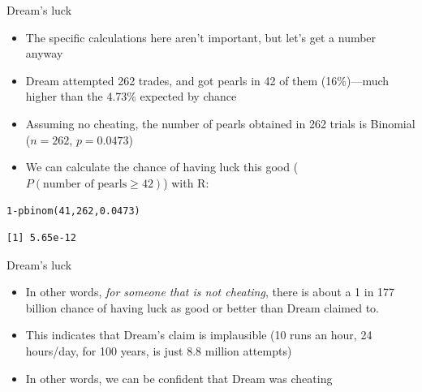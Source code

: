 \documentclass{beamer}\usepackage[]{graphicx}\usepackage[]{color}
\makeatletter
\newcommand{\hlnum}[1]{\textcolor[rgb]{0.824,0.412,0.118}{#1}}%
\newcommand{\hlopt}[1]{\textcolor[rgb]{1,0.894,0.769}{#1}}%
\newcommand{\hlstd}[1]{\textcolor[rgb]{1,0.894,0.769}{#1}}%
\newcommand{\hlkwd}[1]{\textcolor[rgb]{1,0.78,0.769}{#1}}%
\newenvironment{kframe}{%
 \def\at@end@of@kframe{}%
 \ifinner\ifhmode%
  \def\at@end@of@kframe{\end{minipage}}%
  \begin{minipage}{\columnwidth}%
 \fi\fi%
 \def\FrameCommand##1{\hskip\@totalleftmargin \hskip-\fboxsep
 \colorbox{shadecolor}{##1}\hskip-\fboxsep
     \hskip-\linewidth \hskip-\@totalleftmargin \hskip\columnwidth}%
 \MakeFramed {\advance\hsize-\width
   \@totalleftmargin\z@ \linewidth\hsize
   \@setminipage}}%
 {\par\unskip\endMakeFramed%
 \at@end@of@kframe}
\newenvironment{knitrout}{}{} %
\makeatother
\begin{document}
\begin{darkframes}
    \begin{frame}[fragile]{Dream's luck}
      \begin{itemize}[<+->]
        \item The specific calculations here aren't important, but let's get a number anyway
        \item Dream attempted 262 trades, and got pearls in 42 of them (16\%)---much higher than the 4.73\% expected by chance
        \item Assuming no cheating, the number of pearls obtained in 262 trials is Binomial ($n=262$, $p=0.0473$)
        \item We can calculate the chance of having luck this good ($P(\text{number of pearls} \geq 42)$) with R:
      \end{itemize}
      \pause
\begin{knitrout}
\color{fgcolor}\begin{kframe}
\begin{alltt}
\hlnum{1} \hlopt{-} \hlkwd{pbinom}\hlstd{(}\hlnum{41}\hlstd{,} \hlnum{262}\hlstd{,} \hlnum{0.0473}\hlstd{)}
\end{alltt}
\begin{verbatim}
[1] 5.65e-12
\end{verbatim}
\end{kframe}
\end{knitrout}
    \end{frame}

    \begin{frame}{Dream's luck}
      \begin{itemize}[<+->]
        \item In other words, \emph{for someone that is not cheating}, there is about a 1 in 177 billion chance of having luck as good or better than Dream claimed to.
        \item This indicates that Dream's claim is implausible (10 runs an hour, 24 hours/day, for 100 years, is just 8.8 million attempts)
        \item In other words, we can be confident that Dream was cheating
      \end{itemize}
    \end{frame}


\end{darkframes}
\end{document}
